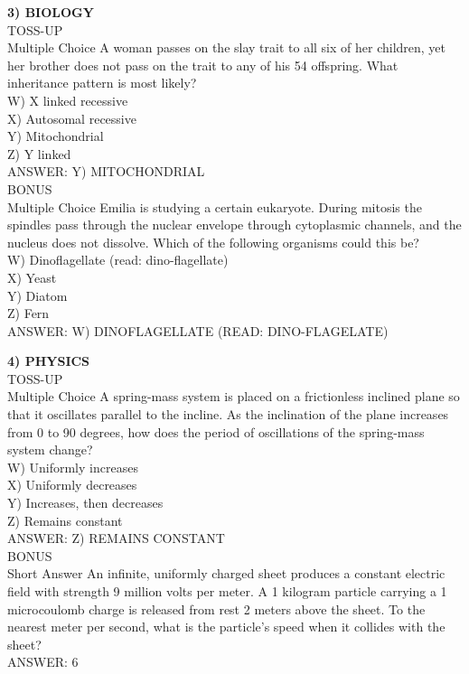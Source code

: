 \documentclass{article}
\begin{document}
\noindent \textbf{3) BIOLOGY} \\
TOSS-UP \\
Multiple Choice A woman passes on the slay trait to all six of her children, yet her brother does not pass on the trait to any of his 54 offspring. What inheritance pattern is most likely? \\
W) X linked recessive \\
X) Autosomal recessive \\
Y) Mitochondrial \\
Z) Y linked \\
ANSWER: Y) MITOCHONDRIAL \\
BONUS \\
Multiple Choice Emilia is studying a certain eukaryote. During mitosis the spindles pass through the nuclear envelope through cytoplasmic channels, and the nucleus does not dissolve. Which of the following organisms could this be? \\
W) Dinoflagellate (read: dino-flagellate) \\
X) Yeast \\
Y) Diatom \\
Z) Fern \\
ANSWER: W) DINOFLAGELLATE (READ: DINO-FLAGELATE)

\noindent \textbf{4) PHYSICS} \\
TOSS-UP \\
Multiple Choice A spring-mass system is placed on a frictionless inclined plane so that it oscillates parallel to the incline. As the inclination of the plane increases from 0 to 90 degrees, how does the period of oscillations of the spring-mass system change? \\
W) Uniformly increases \\
X) Uniformly decreases \\
Y) Increases, then decreases \\
Z) Remains constant \\
ANSWER: Z) REMAINS CONSTANT \\
BONUS \\
Short Answer An infinite, uniformly charged sheet produces a constant electric field with strength 9 million volts per meter. A 1 kilogram particle carrying a 1 microcoulomb charge is released from rest 2 meters above the sheet. To the nearest meter per second, what is the particle's speed when it collides with the sheet? \\
ANSWER: 6
\end{document}
